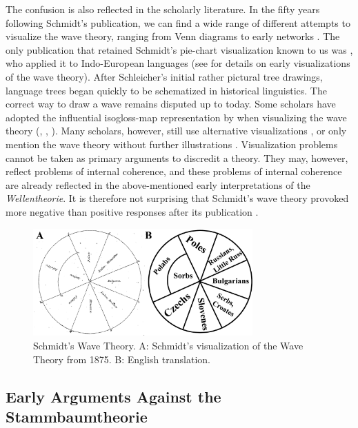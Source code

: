 \documentclass[svgnames,12pt]{scrartcl}
\begin{document}
{The confusion is also reflected in the scholarly literature. In the fifty years following Schmidt's
publication, we can find a wide range of different attempts to visualize the wave theory, ranging
from Venn diagrams \citep[93]{Hirt1905} to early networks \citep[174]{Bonfante1931}. The only
publication that retained Schmidt's pie-chart visualization known to us was
\citet[134]{Meillet1908}, who applied it to Indo-European languages (see \citealt{Geisler2013} for
details on early visualizations of the wave theory). After Schleicher's initial rather pictural tree
drawings, language trees began quickly to be schematized in historical linguistics. The correct
way to draw a wave remains disputed up to today. Some scholars have adopted the influential
isogloss-map representation by \citet[316]{Bloomfield1933} when visualizing the wave theory
(\citealt[305]{Anttila1972}, \citealt[153-170]{Burlak2005}, \citealt[13-48]{Holzer1996}). Many
scholars, however, still use alternative visualizations \citep[124]{Lehmann1969}, or only mention
the wave theory without further illustrations \citep{Hock1986}.  Visualization problems cannot be
taken as primary arguments to discredit a theory. They may, however, reflect problems of internal
coherence, and these problems of internal coherence are already reflected in the above-mentioned
early interpretations of the \emph{Wellentheorie}. It is therefore not surprising that Schmidt's wave
theory provoked more negative than positive responses after its publication
\citep{Brugmann1884,Hirt1905}. 


\begin{figure}[htb]
\centering
\includegraphics[width=0.75\textwidth]{images/schmidt-1875.pdf}
\caption{Schmidt's Wave Theory. A: Schmidt's visualization of the Wave Theory from 1875. B: English
translation.}
\label{fig:schmidt1875}
\end{figure}

\subsection{Early Arguments Against the Stammbaumtheorie}

}
\end{document}
